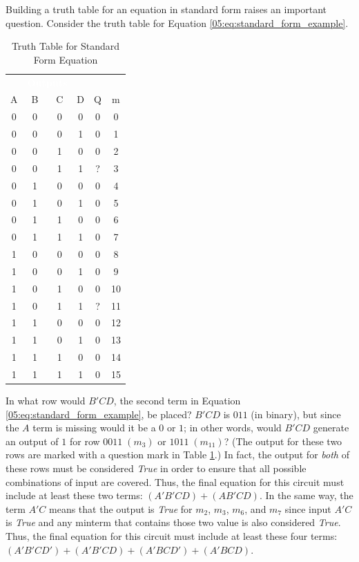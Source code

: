 Building a truth table for an equation in standard form raises an important question. Consider the truth table for Equation \ref{05:eq:standard_form_example}.

\begin{table}[H]
  \sffamily
  \newcommand{\head}[1]{\textcolor{white}{\textbf{#1}}}    
  \begin{center}
    \begin{tabular}{cccc|cc} 
      \rowcolor{black!75}
      \multicolumn{4}{c}{\head{Inputs}} & \multicolumn{2}{c}{\head{Outputs}} \\
      A & B & C & D & Q & m \\
      \hline
      0 & 0 & 0 & 0 & 0 & 0 \\
      0 & 0 & 0 & 1 & 0 & 1 \\
      0 & 0 & 1 & 0 & 0 & 2 \\
      0 & 0 & 1 & 1 & ? & 3 \\
      0 & 1 & 0 & 0 & 0 & 4 \\
      0 & 1 & 0 & 1 & 0 & 5 \\
      0 & 1 & 1 & 0 & 0 & 6 \\
      0 & 1 & 1 & 1 & 0 & 7 \\
      1 & 0 & 0 & 0 & 0 & 8 \\
      1 & 0 & 0 & 1 & 0 & 9 \\
      1 & 0 & 1 & 0 & 0 & 10 \\
      1 & 0 & 1 & 1 & ? & 11 \\
      1 & 1 & 0 & 0 & 0 & 12 \\
      1 & 1 & 0 & 1 & 0 & 13 \\
      1 & 1 & 1 & 0 & 0 & 14 \\
      1 & 1 & 1 & 1 & 0 & 15 
    \end{tabular}
  \end{center}
  \caption{Truth Table for Standard Form Equation}
  \label{05:tab:truth_table_for_standard_form_equation}
\end{table}

In what row would $ B'CD $, the second term in Equation \ref{05:eq:standard_form_example}, be placed? $ B'CD $ is $ 011 $ (in binary), but since the $ A $ term is missing would it be a $ 0 $ or $ 1 $; in other words, would $ B'CD $ generate an output of $ 1 $ for row $ 0011\;(m_3)$ or $ 1011\;(m_{11})$? (The output for these two rows are marked with a question mark in Table \ref{05:tab:truth_table_for_standard_form_equation}.) In fact, the output for \emph{both} of these rows must be considered \emph{True} in order to ensure that all possible combinations of input are covered. Thus, the final equation for this circuit must include at least these two terms: $ (A'B'CD) + (AB'CD) $. In the same way, the term $ A'C $ means that the output is \emph{True} for $ m_2 $, $ m_3 $, $ m_6 $, and $ m_7 $ since input $ A'C $ is \emph{True} and any minterm that contains those two value is also considered \emph{True}. Thus, the final equation for this circuit must include at least these four terms: $ (A'B'CD') + (A'B'CD) + (A'BCD') + (A'BCD) $.


